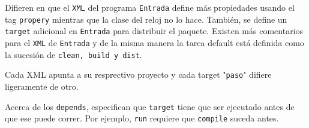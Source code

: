 \documentclass[11pt,letterpaper]{article}
\begin{document}
\begin{enumerate}
        Difieren en que el \texttt{XML} del programa \texttt{Entrada} define
        más propiedades usando el tag \texttt{propery} mientras que la clase del
        reloj no lo hace. También, se define un \texttt{target} adicional en
        \texttt{Entrada} para distribuir el paquete. Existen más comentarios para
        el \texttt{XML} de \texttt{Entrada} y de la misma manera la tarea default
        está definida como la sucesión de \texttt{clean, build y dist}.

        Cada XML apunta a su resprectivo proyecto y cada target "\texttt{paso}"
        difiere ligeramente de otro.

        Acerca de los \texttt{depends}, especifican que \texttt{target} tiene
        que ser ejecutado antes de que ese puede correr. Por ejemplo, \texttt{run}
        requiere que \texttt{compile} suceda antes.

\end{enumerate}
\end{document}
